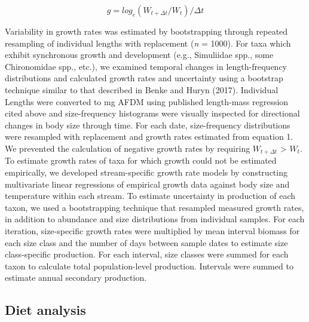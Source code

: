 \documentclass[
]{article}
\begin{document}
\[g = log_e ( W_{t+\Delta t} / W_t) / \Delta t\]

Variability in growth rates was estimated by bootstrapping through
repeated resampling of individual lengths with replacement (\emph{n} =
1000). For taxa which exhibit synchronous growth and development (e.g.,
Simuliidae spp., some Chironomidae spp., etc.), we examined temporal
changes in length-frequency distributions and calculated growth rates
and uncertainty using a bootstrap technique similar to that described in
Benke and Huryn (2017). Individual Lengths were converted to mg AFDM
using published length-mass regression cited above and size-frequency
histograms were visually inspected for directional changes in body size
through time. For each date, size-frequency distributions were resampled
with replacement and growth rates estimated from equation 1. We
prevented the calculation of negative growth rates by requiring
\(W_{t + \Delta t}\) \textgreater{} \(W_t\). To estimate growth rates of
taxa for which growth could not be estimated empirically, we developed
stream-specific growth rate models by constructing multivariate linear
regressions of empirical growth data against body size and temperature
within each stream. To estimate uncertainty in production of each taxon,
we used a bootstrapping technique that resampled measured growth rates,
in addition to abundance and size distributions from individual samples.
For each iteration, size-specific growth rates were multiplied by mean
interval biomass for each size class and the number of days between
sample dates to estimate size class-specific production. For each
interval, size classes were summed for each taxon to calculate total
population-level production. Intervals were summed to estimate annual
secondary production.

\hypertarget{diet-analysis}{%
\subsection{Diet analysis}\label{diet-analysis}}
\end{document}
